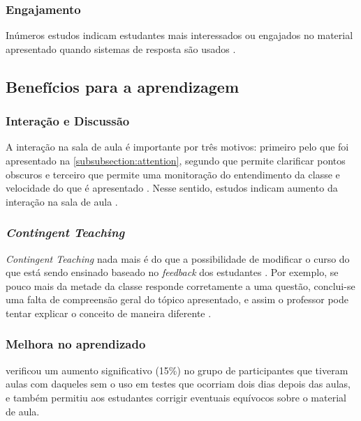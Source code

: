 \subsubsection{Engajamento}
Inúmeros estudos indicam estudantes mais interessados ou engajados no material
apresentado quando sistemas de resposta são usados
\cite{Kaya2016, Rana2016, Horne2015, Mattos2015, Moratelli2014, Kulatunga2014, Blood2013, Terrion2012,
Caldwell2007}.

\subsection{Benefícios para a aprendizagem}

\subsubsection{Interação e Discussão}
A interação na sala de aula é importante por três motivos: primeiro pelo que foi
apresentado na \autoref{subsubsection:attention}, segundo que permite clarificar
pontos obscuros e terceiro que permite uma monitoração do entendimento da classe
e velocidade do que é apresentado \cite{DInverno2003}. Nesse sentido, estudos
indicam aumento da interação na sala de aula \cite{Mattos2015, Barragues2011, Titman2011, Mayer2009, Caldwell2007}.

\subsubsection{\textit{Contingent Teaching}}
\textit{Contingent Teaching} nada mais é do que a possibilidade de modificar
o curso do que está sendo ensinado baseado no \textit{feedback} dos estudantes
\cite{Arnesen2013, Caldwell2007}. Por exemplo, se pouco mais da metade da classe
responde corretamente a uma questão, conclui-se uma falta de compreensão geral do
tópico apresentado, e assim o professor pode tentar explicar o conceito
de maneira diferente \cite{Strasser2010}.

\subsubsection{Melhora no aprendizado}
 verificou um aumento significativo (15\%) no grupo de
participantes que tiveram aulas com {\clickers} daqueles sem o uso em testes que
ocorriam dois dias depois das aulas, e também permitiu aos estudantes corrigir
eventuais equívocos sobre o material de aula.

